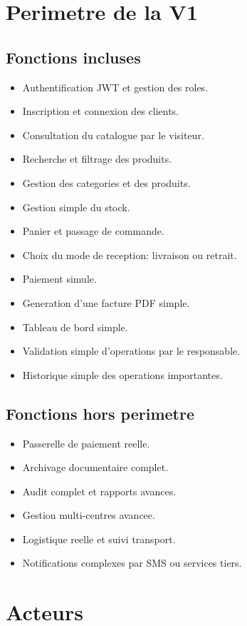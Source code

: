\documentclass[12pt,a4paper]{article}
\begin{document}
\section{Perimetre de la V1}

\subsection{Fonctions incluses}
\begin{itemize}
  \item Authentification JWT et gestion des roles.
  \item Inscription et connexion des clients.
  \item Consultation du catalogue par le visiteur.
  \item Recherche et filtrage des produits.
  \item Gestion des categories et des produits.
  \item Gestion simple du stock.
  \item Panier et passage de commande.
  \item Choix du mode de reception: livraison ou retrait.
  \item Paiement simule.
  \item Generation d'une facture PDF simple.
  \item Tableau de bord simple.
  \item Validation simple d'operations par le responsable.
  \item Historique simple des operations importantes.
\end{itemize}

\subsection{Fonctions hors perimetre}
\begin{itemize}
  \item Passerelle de paiement reelle.
  \item Archivage documentaire complet.
  \item Audit complet et rapports avances.
  \item Gestion multi-centres avancee.
  \item Logistique reelle et suivi transport.
  \item Notifications complexes par SMS ou services tiers.
\end{itemize}

\section{Acteurs}
\end{document}
